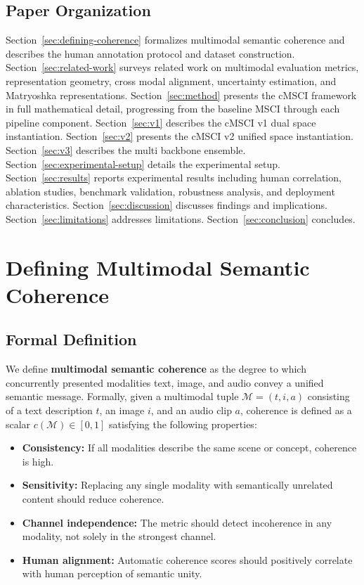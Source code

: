 \documentclass[a4paper,fleqn]{cas-sc}
\begin{document}
\subsection{Paper Organization}\label{sec:paper-organization}

Section~\ref{sec:defining-coherence} formalizes multimodal semantic coherence and describes the human annotation protocol and dataset construction. Section~\ref{sec:related-work} surveys related work on multimodal evaluation metrics, representation geometry, cross modal alignment, uncertainty estimation, and Matryoshka representations. Section~\ref{sec:method} presents the cMSCI framework in full mathematical detail, progressing from the baseline MSCI through each pipeline component. Section~\ref{sec:v1} describes the cMSCI v1 dual space instantiation. Section~\ref{sec:v2} presents the cMSCI v2 unified space instantiation. Section~\ref{sec:v3} describes the multi backbone ensemble. Section~\ref{sec:experimental-setup} details the experimental setup. Section~\ref{sec:results} reports experimental results including human correlation, ablation studies, benchmark validation, robustness analysis, and deployment characteristics. Section~\ref{sec:discussion} discusses findings and implications. Section~\ref{sec:limitations} addresses limitations. Section~\ref{sec:conclusion} concludes.



\section{Defining Multimodal Semantic Coherence}

\subsection{Formal Definition}

We define \textbf{multimodal semantic coherence} as the degree to which concurrently presented modalities text, image, and audio convey a unified semantic message. Formally, given a multimodal tuple $\mathcal{M} = (t, i, a)$ consisting of a text description $t$, an image $i$, and an audio clip $a$, coherence is defined as a scalar $c(\mathcal{M}) \in [0,1]$ satisfying the following properties:

\begin{itemize}
    \item \textbf{Consistency:} If all modalities describe the same scene or concept, coherence is high.
    \item \textbf{Sensitivity:} Replacing any single modality with semantically unrelated content should reduce coherence.
    \item \textbf{Channel independence:} The metric should detect incoherence in any modality, not solely in the strongest channel.
    \item \textbf{Human alignment:} Automatic coherence scores should positively correlate with human perception of semantic unity.
\end{itemize}
\end{document}

